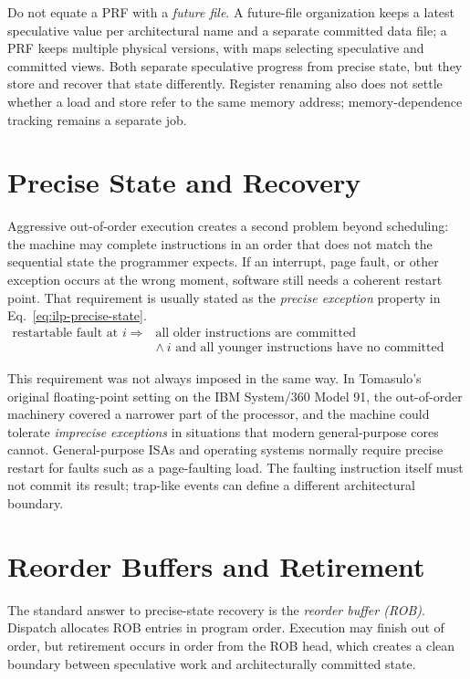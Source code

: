 Do not equate a PRF with a \textit{future file}.
A future-file organization keeps a latest speculative value per architectural name and a separate committed data file; a PRF keeps multiple physical versions, with maps selecting speculative and committed views.
Both separate speculative progress from precise state, but they store and recover that state differently.
Register renaming also does not settle whether a load and store refer to the same memory address; memory-dependence tracking remains a separate job.


\section{Precise State and Recovery}\label{sec:ilp-precise-state}
Aggressive out-of-order execution creates a second problem beyond scheduling: the machine may complete instructions in an order that does not match the sequential state the programmer expects.
If an interrupt, page fault, or other exception occurs at the wrong moment, software still needs a coherent restart point.
That requirement is usually stated as the \textit{precise exception} property in Eq.~\eqref{eq:ilp-precise-state}.
\begin{equation}\label{eq:ilp-precise-state}
    \begin{aligned}
        \text{restartable fault at }i \Rightarrow\ &\text{all older instructions are committed}\\
        &\wedge\ \text{$i$ and all younger instructions have no committed effects}
    \end{aligned}
\end{equation}

This requirement was not always imposed in the same way.
In Tomasulo's original floating-point setting on the IBM System/360 Model 91, the out-of-order machinery covered a narrower part of the processor, and the machine could tolerate \textit{imprecise exceptions} in situations that modern general-purpose cores cannot.
General-purpose ISAs and operating systems normally require precise restart for faults such as a page-faulting load.
The faulting instruction itself must not commit its result; trap-like events can define a different architectural boundary.


\section{Reorder Buffers and Retirement}\label{sec:ilp-rob}
The standard answer to precise-state recovery is the \textit{reorder buffer (ROB)}.
Dispatch allocates ROB entries in program order.
Execution may finish out of order, but retirement occurs in order from the ROB head, which creates a clean boundary between speculative work and architecturally committed state.

